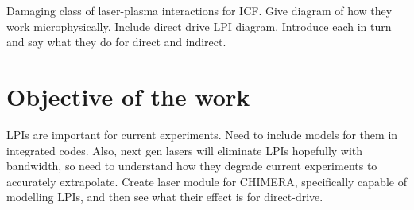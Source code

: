 Damaging class of laser-plasma interactions for ICF.
Give diagram of how they work microphysically.
Include direct drive LPI diagram.
Introduce each in turn and say what they do for direct and indirect.

\section{Objective of the work}%
\label{sec:intro_objective}

LPIs are important for current experiments.
Need to include models for them in integrated codes.
Also, next gen lasers will eliminate LPIs hopefully with bandwidth, so need to understand how they degrade current experiments to accurately extrapolate.
Create laser module for CHIMERA, specifically capable of modelling LPIs, and then see what their effect is for direct-drive.
